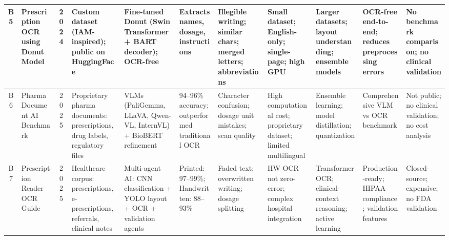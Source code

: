 \documentclass[conference]{IEEEtran}
\begin{document}
\begin{table}[!htbp]
{\begin{tabular}{|c|p{2.2cm}|c|p{2.2cm}|p{2.2cm}|p{1.8cm}|p{1.8cm}|p{1.8cm}|p{2.0cm}|p{1.8cm}|p{1.8cm}|}
B5 & Prescription OCR using Donut Model & 2024 &
Custom dataset (IAM-inspired); public on HuggingFace &
Fine-tuned Donut (Swin Transformer + BART decoder); OCR-free &
Extracts names, dosage, instructions &
Illegible writing; similar chars; merged letters; abbreviations &
Small dataset; English-only; single-page; high GPU &
Larger datasets; layout understanding; ensemble models &
OCR-free end-to-end; reduces preprocessing errors &
No benchmark comparison; no clinical validation \\
\hline

B6 & Pharma Document AI Benchmark  & 2025 &
Proprietary pharma documents: prescriptions, drug labels, regulatory files &
VLMs (PaliGemma, LLaVA, Qwen-VL, InternVL) + BioBERT refinement &
94--96\% accuracy; outperformed traditional OCR &
Character confusion; dosage unit mistakes; scan quality &
High computational cost; proprietary dataset; limited multilingual &
Ensemble learning; model distillation; quantization &
Comprehensive VLM vs OCR benchmark &
Not public; no clinical validation; no cost analysis \\
\hline

B7 & Prescription Reader OCR Guide  & 2025 &
Healthcare corpus: prescriptions, e-prescriptions, referrals, clinical notes &
Multi-agent AI: CNN classification + YOLO layout + OCR + validation agents &
Printed: 97--99\%; Handwritten: 88--93\% &
Faded text; overwritten writing; dosage splitting &
HW OCR not zero-error; complex hospital integration &
Transformer OCR; clinical-context reasoning; active learning &
Production-ready; HIPAA compliance; validation features &
Closed-source; expensive; no FDA validation \\
\hline
\end{tabular}
}
\end{table}
\end{document}
